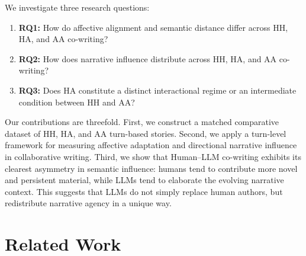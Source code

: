 \documentclass[11pt]{article}
\begin{document}
We investigate three research questions:

\begin{enumerate}
    \item \textbf{RQ1:} How do affective alignment and semantic distance differ across HH, HA, and AA co-writing?
    \item \textbf{RQ2:} How does narrative influence distribute across HH, HA, and AA co-writing?
    \item \textbf{RQ3:} Does HA constitute a distinct interactional regime or an intermediate condition between HH and AA?
\end{enumerate}

Our contributions are threefold. First, we construct a matched comparative dataset of HH, HA, and AA turn-based stories. Second, we apply a turn-level framework for measuring affective adaptation and directional narrative influence in collaborative writing. Third, we show that Human--LLM co-writing exhibits its clearest asymmetry in semantic influence: humans tend to contribute more novel and persistent material, while LLMs tend to elaborate the evolving narrative context. This suggests that LLMs do not simply replace human authors, but redistribute narrative agency in a unique way.

\section{Related Work}
\end{document}
